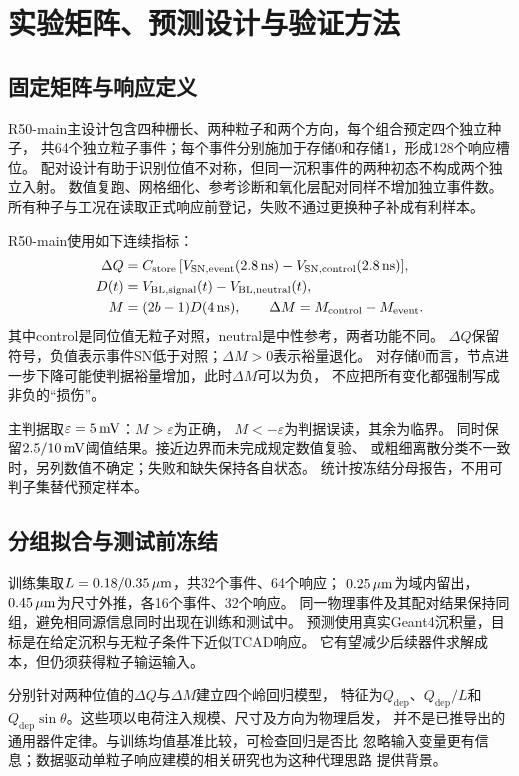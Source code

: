 \section{实验矩阵、预测设计与验证方法}
\label{cr:design}
\subsection{固定矩阵与响应定义}
R50-main主设计包含四种栅长、两种粒子和两个方向，每个组合预定四个独立种子，
共64个独立粒子事件；每个事件分别施加于存储0和存储1，形成128个响应槽位。
配对设计有助于识别位值不对称，但同一沉积事件的两种初态不构成两个独立入射。
数值复跑、网格细化、参考诊断和氧化层配对同样不增加独立事件数。
所有种子与工况在读取正式响应前登记，失败不通过更换种子补成有利样本。

R50-main使用如下连续指标：
\begin{align}
\Delta Q&=C_{\mathrm{store}}\,[V_{\mathrm{SN,event}}(2.8\,\mathrm{ns})
 -V_{\mathrm{SN,control}}(2.8\,\mathrm{ns})],\\
D(t)&=V_{\mathrm{BL,signal}}(t)-V_{\mathrm{BL,neutral}}(t),\\
M&=(2b-1)D(4\,\mathrm{ns}),\qquad
\Delta M=M_{\mathrm{control}}-M_{\mathrm{event}}.
\label{cr:metrics}
\end{align}
其中control是同位值无粒子对照，neutral是中性参考，两者功能不同。
$\Delta Q$保留符号，负值表示事件SN低于对照；$\Delta M>0$表示裕量退化。
对存储0而言，节点进一步下降可能使判据裕量增加，此时$\Delta M$可以为负，
不应把所有变化都强制写成非负的“损伤”。

主判据取$\varepsilon=5\,\mathrm{mV}$：$M>\varepsilon$为正确，
$M<-\varepsilon$为判据误读，其余为临界。
同时保留$2.5/10\,\mathrm{mV}$阈值结果。接近边界而未完成规定数值复验、
或粗细离散分类不一致时，另列数值不确定；失败和缺失保持各自状态。
统计按冻结分母报告，不用可判子集替代预定样本。

\subsection{分组拟合与测试前冻结}
训练集取$L=0.18/0.35\,\mu\mathrm{m}$，共32个事件、64个响应；
$0.25\,\mu\mathrm{m}$为域内留出，$0.45\,\mu\mathrm{m}$为尺寸外推，各16个事件、32个响应。
同一物理事件及其配对结果保持同组，避免相同源信息同时出现在训练和测试中。
预测使用真实Geant4沉积量，目标是在给定沉积与无粒子条件下近似TCAD响应。
它有望减少后续器件求解成本，但仍须获得粒子输运输入。

分别针对两种位值的$\Delta Q$与$\Delta M$建立四个岭回归模型，
特征为$Q_{\mathrm{dep}}$、$Q_{\mathrm{dep}}/L$和
$Q_{\mathrm{dep}}\sin\theta$。这些项以电荷注入规模、尺寸及方向为物理启发，
并不是已推导出的通用器件定律。与训练均值基准比较，可检查回归是否比
忽略输入变量更有信息；数据驱动单粒子响应建模的相关研究也为这种代理思路
提供背景\cite{xu2021}。

